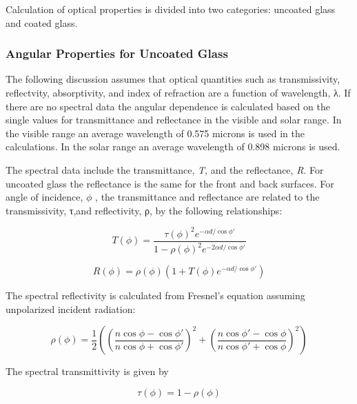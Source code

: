 Calculation of optical properties is divided into two categories: uncoated glass and coated glass.

\subsubsection{Angular Properties for Uncoated Glass}\label{angular-properties-for-uncoated-glass}

The following discussion assumes that optical quantities such as transmissivity, reflectvity, absorptivity, and index of refraction are a function of wavelength, λ. If there are no spectral data the angular dependence is calculated based on the single values for transmittance and reflectance in the visible and solar range. In the visible range an average wavelength of 0.575 microns is used in the calculations. In the solar range an average wavelength of 0.898 microns is used.

The spectral data include the transmittance, \emph{T}, and the reflectance, \emph{R}. For uncoated glass the reflectance is the same for the front and back surfaces. For angle of incidence, \(\phi\) , the transmittance and reflectance are related to the transmissivity, τ,and reflectivity, ρ, by the following relationships:

\begin{equation}
T(\phi ) = \frac{{\tau {{(\phi )}^2}{e^{ - \alpha d/\cos \phi '}}}}{{1 - \rho {{(\phi )}^2}{e^{ - 2\alpha d/\cos \phi '}}}}
\end{equation}

\begin{equation}
R(\phi ) = \rho (\phi )\left( {1 + T(\phi ){e^{ - \alpha d/\cos \phi '}}} \right)
\end{equation}

The spectral reflectivity is calculated from Fresnel's equation assuming unpolarized incident radiation:

\begin{equation}
\rho (\phi ) = \frac{1}{2}\left( {{{\left( {\frac{{n\cos \phi  - \cos \phi '}}{{n\cos \phi  + \cos \phi '}}} \right)}^2} + {{\left( {\frac{{n\cos \phi ' - \cos \phi }}{{n\cos \phi ' + \cos \phi }}} \right)}^2}} \right)
\end{equation}

The spectral transmittivity is given by

\begin{equation}
\tau (\phi ) = 1 - \rho (\phi )
\end{equation}

